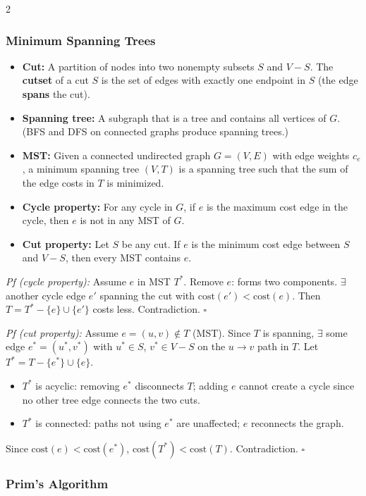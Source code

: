 \documentclass[9pt]{article}
\begin{document}
\begin{multicols}{2}
\subsubsection*{Minimum Spanning Trees}

\begin{itemize}
  \item \textbf{Cut:} A partition of nodes into two nonempty subsets $S$ and $V-S$. The \textbf{cutset} of a cut $S$ is the set of edges with exactly one endpoint in $S$ (the edge \textbf{spans} the cut).
  \item \textbf{Spanning tree:} A subgraph that is a tree and contains all vertices of $G$. (BFS and DFS on connected graphs produce spanning trees.)
  \item \textbf{MST:} Given a connected undirected graph $G=(V,E)$ with edge weights $c_e$, a minimum spanning tree $(V,T)$ is a spanning tree such that the sum of the edge costs in $T$ is minimized.
  \item \textbf{Cycle property:} For any cycle in $G$, if $e$ is the maximum cost edge in the cycle, then $e$ is not in any MST of $G$.
  \item \textbf{Cut property:} Let $S$ be any cut. If $e$ is the minimum cost edge between $S$ and $V-S$, then every MST contains $e$.
\end{itemize}

\textit{Pf (cycle property):} Assume $e$ in MST $T^*$. Remove $e$: forms two components. $\exists$ another cycle edge $e'$ spanning the cut with $\mathrm{cost}(e')<\mathrm{cost}(e)$. Then $T=T^*-\{e\}\cup\{e'\}$ costs less. Contradiction. $\square$

\textit{Pf (cut property):} Assume $e=(u,v)\not\in T$ (MST). Since $T$ is spanning, $\exists$ some edge $e^*=(u^*,v^*)$ with $u^*\in S$, $v^*\in V-S$ on the $u\to v$ path in $T$. Let $T^*=T-\{e^*\}\cup\{e\}$.
\begin{itemize}
  \item $T^*$ is acyclic: removing $e^*$ disconnects $T$; adding $e$ cannot create a cycle since no other tree edge connects the two cuts.
  \item $T^*$ is connected: paths not using $e^*$ are unaffected; $e$ reconnects the graph.
\end{itemize}
Since $\mathrm{cost}(e)<\mathrm{cost}(e^*)$, $\mathrm{cost}(T^*)<\mathrm{cost}(T)$. Contradiction. $\square$

\subsubsection*{Prim's Algorithm}


\end{multicols}
\end{document}
